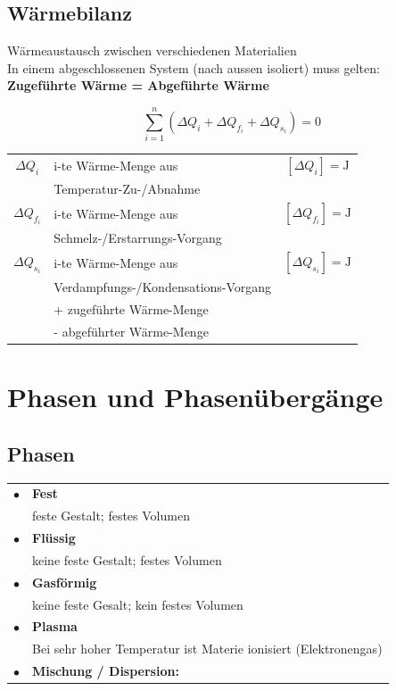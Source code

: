 


\subsection{Wärmebilanz}
Wärmeaustausch zwischen verschiedenen Materialien \\

In einem abgeschlossenen System (nach aussen isoliert) muss gelten: \\
\textbf{Zugeführte Wärme = Abgeführte Wärme}

$$  \boxed{ \sum_{i=1}^n  ( \Delta Q_i + \Delta Q_{f_i} + \Delta Q_{s_i} ) = 0 } $$


\begin{tabular}{c l c}
	$\Delta Q_i$ & i-te Wärme-Menge aus & $[\Delta Q_i] = \mathrm{J}$ \\
				& Temperatur-Zu-/Abnahme & \\
	$\Delta Q_{f_i}$ & i-te Wärme-Menge aus  &  $[\Delta Q_{f_i}] = \mathrm{J}$ \\
				& Schmelz-/Erstarrungs-Vorgang  & \\
	$\Delta Q_{s_i}$ & i-te Wärme-Menge aus & $[\Delta Q_{s_i}] = \mathrm{J}$\\
					 & Verdampfungs-/Kondensations-Vorgang &  \\
	& +  zugeführte Wärme-Menge &  \\
	& - abgeführter Wärme-Menge & \\
\end{tabular}




\section{Phasen und Phasenübergänge}


\subsection{Phasen}


\begin{tabular}{ll}
$\bullet$ & \textbf{Fest} \\
		  & feste Gestalt; festes Volumen \\
$\bullet$ & \textbf{Flüssig} \\
		  & keine feste Gestalt; festes Volumen \\
$\bullet$ & \textbf{Gasförmig} \\
		  & keine feste Gesalt; kein festes Volumen \\
$\bullet$ & \textbf{Plasma} \\
		  & Bei sehr hoher Temperatur ist Materie ionisiert (Elektronengas) \\
$\bullet$ & \textbf{Mischung / Dispersion:} \\
\end{tabular}

